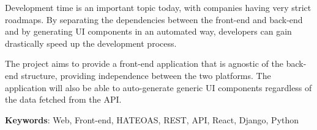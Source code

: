 
Development time is an important topic today, with companies having very strict roadmaps. By separating the dependencies between the front-end and back-end and by generating UI components in an automated way, developers can gain drastically speed up the development process.

The project aims to provide a front-end application that is agnostic of the back-end structure, providing independence between the two platforms. The application will also be able to auto-generate generic UI components regardless of the data fetched from the API.

\textbf{Keywords}: Web, Front-end, HATEOAS, REST, API, React, Django, Python